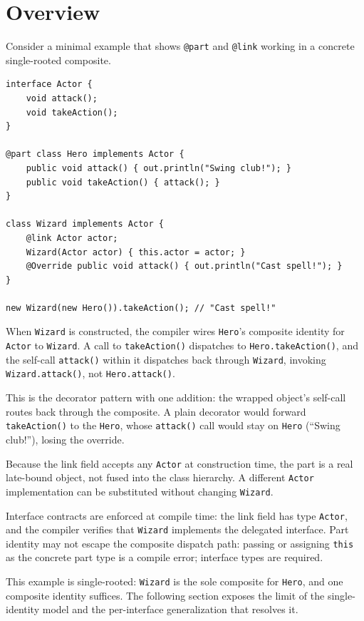 \documentclass[sigplan,10pt,review,anonymous]{acmart}
\theoremstyle{acmplain}
\newcommand{\code}[1]{\texttt{#1}}
\begin{document}
\section{Overview}

Consider a minimal example that shows \code{@part} and \code{@link} working in a concrete single-rooted composite.

\begin{lstlisting}
interface Actor {
    void attack();
    void takeAction();
}

@part class Hero implements Actor {
    public void attack() { out.println("Swing club!"); }
    public void takeAction() { attack(); }
}

class Wizard implements Actor {
    @link Actor actor;
    Wizard(Actor actor) { this.actor = actor; }
    @Override public void attack() { out.println("Cast spell!"); }
}

new Wizard(new Hero()).takeAction(); // "Cast spell!"
\end{lstlisting}

When \code{Wizard} is constructed, the compiler wires \code{Hero}'s
composite identity for \code{Actor} to \code{Wizard}. A call to
\code{takeAction()} dispatches to \code{Hero.takeAction()}, and the self-call
\code{attack()} within it dispatches back through \code{Wizard}, invoking
\code{Wizard.attack()}, not \code{Hero.attack()}.

This is the decorator pattern with one addition: the wrapped object's self-call
routes back through the composite. A plain decorator would forward
\code{takeAction()} to the \code{Hero}, whose \code{attack()} call would stay on
\code{Hero} (``Swing club!''), losing the override.

Because the link field accepts any \code{Actor} at construction
time, the part is a real late-bound object, not fused into the class
hierarchy. A different \code{Actor} implementation can be substituted
without changing \code{Wizard}.

Interface contracts are enforced at compile time: the link field has
type \code{Actor}, and the compiler verifies that \code{Wizard}
implements the delegated interface. Part identity may not escape the
composite dispatch path: passing or assigning \code{this} as the concrete
part type is a compile error; interface types are required.

This example is single-rooted: \code{Wizard} is the sole composite
for \code{Hero}, and one composite identity suffices. The following
section exposes the limit of the single-identity model and the per-interface
generalization that resolves it.
\end{document}
